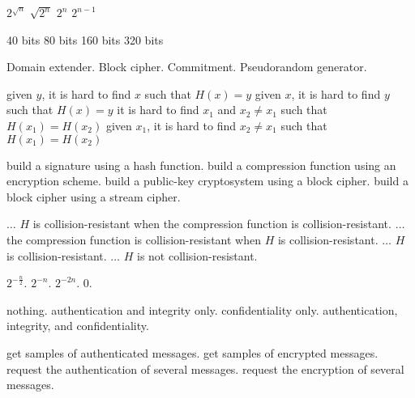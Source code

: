 {$2^{\sqrt{n}}$}
{$\sqrt{2^n}$}
{$2^n$}
{$2^{n-1}$}

{40 bits}
{80 bits}
{160 bits}
{320 bits}

%
{Domain extender.}%
{Block cipher.}%
{Commitment.}%
{Pseudorandom generator.}%

%
{given $y$, it is hard to find $x$ such that $H(x)=y$}%
{given $x$, it is hard to find $y$ such that $H(x)=y$}%
{it is hard to find $x_1$ and $x_2\neq x_1$ such that $H(x_1)=H(x_2)$}%
{given $x_1$, it is hard to find $x_2\neq x_1$ such that $H(x_1)=H(x_2)$}%

%
{build a signature using a hash function.}%
{build a compression function using an encryption scheme.}%
{build a public-key cryptosystem using a block cipher.}%
{build a block cipher using a stream cipher.}%

%
{$ \dots $ $H$ is collision-resistant when the compression function is collision-resistant.}%
{$ \dots $ the compression function is collision-resistant when $H$ is collision-resistant.}%
{$ \dots $ $H$ is collision-resistant.}%
{$ \dots $ $H$ is not collision-resistant.}%

%
{$2^{-\frac{n}{2}}$.}%
{$2^{-n}$.}%
{$2^{-2n}$.}%
{$0$.}%

 {nothing.}%
 {authentication and integrity only.}%
 {confidentiality only.}%
 {authentication, integrity, and confidentiality.}%
 
{get samples of authenticated messages.}%
{get samples of encrypted messages.}%
{request the authentication of several messages.}%
{request the encryption of several messages.}%

